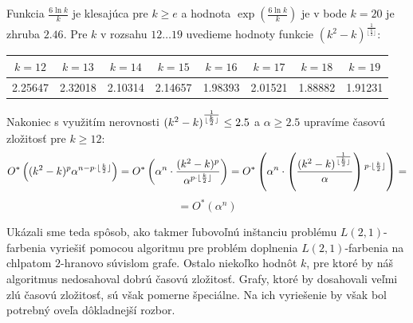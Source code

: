 Funkcia $\frac{6 \ln{k}}{k}$ je klesajúca pre $k \ge e$ a hodnota $\exp{(\frac{6 \ln{k}}{k})}$ je 
v bode $k=20$ je zhruba $2.46$. Pre $k$ v rozsahu $12 \ldots 19$ uvedieme hodnoty funkcie $(k^2 - k)^{\frac{1}{\lfloor \frac{k}{2} \rfloor}}$:

\begin{tabular}{|c | c | c | c | c | c | c | c |} \hline
$ k=12 $ & $ k=13 $ & $ k=14 $ & $ k=15 $ & $ k=16 $ & $ k=17 $ & $ k=18 $ & $ k=19 $ \\ \hline
2.25647 & 2.32018 & 2.10314 & 2.14657 & 1.98393 & 2.01521 & 1.88882 & 1.91231 \\ \hline
\end{tabular}

Nakoniec s využitím nerovnosti $(k^2 - k)\strut^{\frac{1}{\lfloor \frac{k}{2} \rfloor}} \leq 2.5$ a $\alpha \ge 2.5$
upravíme časovú zložitosť pre $k \ge 12$:
$$O^*\left((k^2 - k)^p \alpha^{n - p \cdot \lfloor \frac{k}{2} \rfloor}\right) =
O^*\left(\alpha^{n} \cdot \frac{(k^2 - k)^p}{\alpha^{p \cdot \lfloor \frac{k}{2} \rfloor}}\right) = O^*\left(\alpha^n \cdot \left(\frac{(k^2 - k)^{\frac{1}{\lfloor \frac{k}{2} \rfloor}}}{\alpha}\right) \strut^{p \cdot \lfloor \frac{k}{2} \rfloor}\right) = $$
$$ = O^*(\alpha^n)$$

Ukázali sme teda spôsob, ako takmer ľubovoľnú inštanciu problému $L(2,1)$-farbenia vyriešiť pomocou
algoritmu pre problém doplnenia $L(2,1)$-farbenia na chlpatom $2$-hranovo súvislom grafe. Ostalo
niekoľko hodnôt $k$, pre ktoré by náš algoritmus nedosahoval dobrú časovú zložitosť. Grafy, ktoré
by dosahovali veľmi zlú časovú zložitosť, sú však pomerne špeciálne. Na ich vyriešenie by však
bol potrebný oveľa dôkladnejší rozbor.
